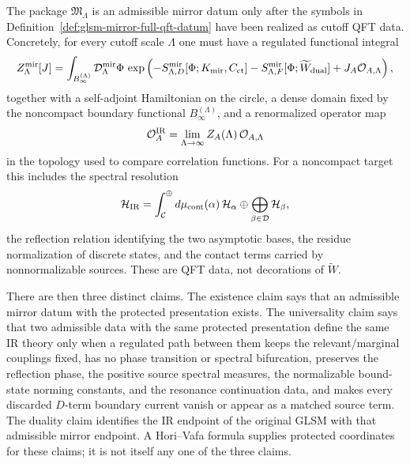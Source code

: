 \begin{definition}
\label{def:glsm-admissible-mirror-datum}
The package \(\mathfrak M_\Lambda\) is an admissible mirror datum only after
the symbols in Definition~\ref{def:glsm-mirror-full-qft-datum} have been
realized as cutoff QFT data.  Concretely, for every cutoff scale \(\Lambda\)
one must have a regulated functional integral
\[
  Z_{\Lambda}^{\rm mir}[J]
  =
  \int_{B_\infty^{(\Lambda)}}{\mathcal D}^{\rm mir}_{\Lambda}\Phi\,
  \exp\left(
    -S_{\Lambda,D}^{\rm mir}[\Phi;K_{\rm mir},C_{\rm ct}]
    -S_{\Lambda,F}^{\rm mir}[\Phi;\widetilde W_{\rm dual}]
    +J_A{\mathcal O}_{A,\Lambda}
  \right),
\]
together with a self-adjoint Hamiltonian on the circle, a dense domain fixed by
the noncompact boundary functional \(B_\infty^{(\Lambda)}\), and a renormalized
operator map
\[
  {\mathcal O}_{A}^{\rm IR}
  =
  \lim_{\Lambda\to\infty}
  Z_A(\Lambda)\,{\mathcal O}_{A,\Lambda}
\]
in the topology used to compare correlation functions.  For a noncompact
target this includes the spectral resolution
\[
  {\mathcal H}_{\rm IR}
  =
  \int_{\mathcal C}^{\oplus} d\mu_{\rm cont}(\alpha)\,
  {\mathcal H}_{\alpha}
  \oplus
  \bigoplus_{\beta\in{\mathcal D}}{\mathcal H}_{\beta},
\]
the reflection relation identifying the two asymptotic bases, the residue
normalization of discrete states, and the contact terms carried by
nonnormalizable sources.  These are QFT data, not decorations of
\(\widetilde W\).

There are then three distinct claims.  The existence claim says that an
admissible mirror datum with the protected presentation exists.  The
universality claim says that two admissible data with the same protected
presentation define the same IR theory only when a regulated path between them
keeps the relevant/marginal couplings fixed, has no phase transition or
spectral bifurcation, preserves the reflection phase, the positive source
spectral measures, the normalizable bound-state norming constants, and the
resonance continuation data, and makes every discarded \(D\)-term boundary
current vanish or appear as a matched source term.  The duality claim
identifies the IR endpoint of the original GLSM with that admissible mirror
endpoint.  A Hori--Vafa formula supplies protected coordinates for these
claims; it is not itself any one of the three claims.
\end{definition}

